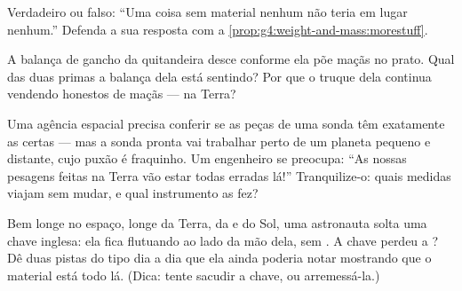 \begin{exercise}[$\star$]\label{exo:g4:weight-and-mass:8}
Verdadeiro ou falso: ``Uma coisa sem material nenhum não teria 
em lugar nenhum.'' Defenda a sua resposta com a
\cref{prop:g4:weight-and-mass:morestuff}.
\end{exercise}

\begin{exercise}[$\star$]\label{exo:g4:weight-and-mass:9}
A balança de gancho da quitandeira desce conforme ela põe maçãs no
prato. Qual das duas primas a balança dela está sentindo? Por que o
truque dela continua vendendo  honestos de maçãs --- na
Terra?
\end{exercise}

\begin{exercise}[$\star\star$]\label{exo:g4:weight-and-mass:10}
Uma agência espacial precisa conferir se as peças de uma sonda têm
exatamente as  certas --- mas a sonda pronta vai trabalhar
perto de um planeta pequeno e distante, cujo puxão é fraquinho. Um
engenheiro se preocupa: ``As nossas pesagens feitas na Terra vão
estar todas erradas lá!'' Tranquilize-o: quais medidas viajam sem
mudar, e qual instrumento as fez?
\end{exercise}

\begin{exercise}[$\star\star$]\label{exo:g4:weight-and-mass:11}
Bem longe no espaço, longe da Terra, da  e do Sol, uma astronauta
solta uma chave inglesa: ela fica flutuando ao lado da mão dela, sem
. A chave perdeu a ? Dê duas pistas do tipo dia a dia que
ela ainda poderia notar mostrando que o material está todo lá.
(Dica: tente sacudir a chave, ou arremessá-la.)
\end{exercise}
